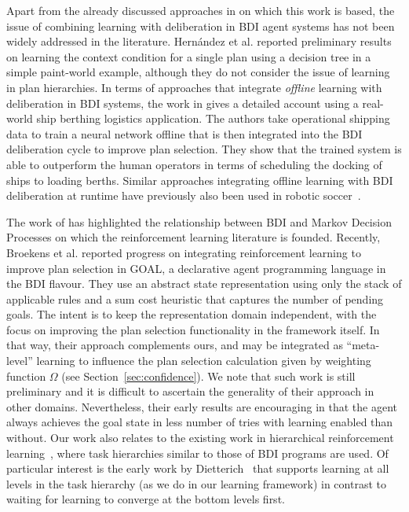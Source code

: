 Apart from the already discussed approaches in \cite{airiau09:enhancing,singh10:extending,singh10:learning} on which this work is based, the issue of combining learning with deliberation in BDI agent systems has not been widely addressed in the literature. 
%
Hern\'andez et al. \cite{hernandez04:learning} reported preliminary results on learning the context condition for a single plan using a decision tree in a simple paint-world example, although they do not consider the issue of learning in plan hierarchies. In terms of approaches that integrate \emph{offline} learning with deliberation in BDI systems, the work in \cite{lokuge07:improving} gives a detailed account using a real-world ship berthing logistics application. The authors take operational shipping data to train a neural network offline that is then integrated into the BDI deliberation cycle to improve plan selection. They show that the trained system is able to outperform the human operators in terms of scheduling the docking of ships to loading berths. Similar approaches integrating offline learning with BDI deliberation at runtime have previously also been used in robotic soccer~\cite{riedmiller01:karlsruhe,brusey02:learning}.

The work of \cite{simari06:relationship} has highlighted the relationship between BDI and Markov Decision Processes on which the reinforcement learning literature is founded. 
%
Recently, Broekens et al. \cite{broekens10:reinforcement} reported progress on integrating reinforcement learning to improve plan selection in GOAL, a declarative agent programming language in the BDI flavour. They use an abstract state representation using only the stack of applicable rules and a sum cost heuristic that captures the number of pending goals. The intent is to keep the representation domain independent, with the focus on improving the plan selection functionality in the framework itself. In that way, their approach complements ours, and may be integrated as ``meta-level'' learning to influence the plan selection calculation given by weighting function $\Omega$ (see Section~\ref{sec:confidence}). We note that such work is still preliminary and it is difficult to ascertain the generality of their approach in other domains. Nevertheless, their early results are encouraging in that the agent always achieves the goal state in less number of tries with learning enabled than without.
%
Our work also relates to the existing work in hierarchical reinforcement learning~\cite{barto03:recent}, where task hierarchies similar to those of BDI programs are used. Of particular interest is the early work by Dietterich~\cite{dietterich00:hierarchical} that supports learning at all levels in the task hierarchy (as we do in our learning framework) in contrast to waiting for learning to converge at the bottom levels first.

